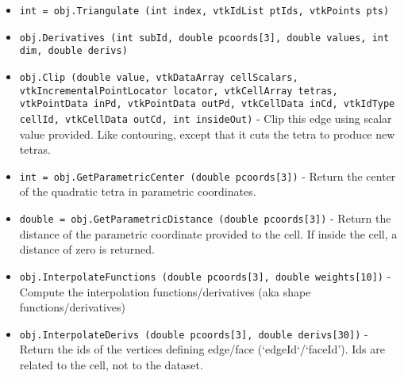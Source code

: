 \begin{itemize}
\item  \verb|int = obj.Triangulate (int index, vtkIdList ptIds, vtkPoints pts)|

\item  \verb|obj.Derivatives (int subId, double pcoords[3], double values, int dim, double derivs)|

\item  \verb|obj.Clip (double value, vtkDataArray cellScalars, vtkIncrementalPointLocator locator, vtkCellArray tetras, vtkPointData inPd, vtkPointData outPd, vtkCellData inCd, vtkIdType cellId, vtkCellData outCd, int insideOut)| -  Clip this edge using scalar value provided. Like contouring, except
 that it cuts the tetra to produce new tetras.

\item  \verb|int = obj.GetParametricCenter (double pcoords[3])| -  Return the center of the quadratic tetra in parametric coordinates.

\item  \verb|double = obj.GetParametricDistance (double pcoords[3])| -  Return the distance of the parametric coordinate provided to the
 cell. If inside the cell, a distance of zero is returned.

\item  \verb|obj.InterpolateFunctions (double pcoords[3], double weights[10])| -  Compute the interpolation functions/derivatives
 (aka shape functions/derivatives)

\item  \verb|obj.InterpolateDerivs (double pcoords[3], double derivs[30])| -  Return the ids of the vertices defining edge/face (`edgeId`/`faceId').
 Ids are related to the cell, not to the dataset.

\end{itemize}
